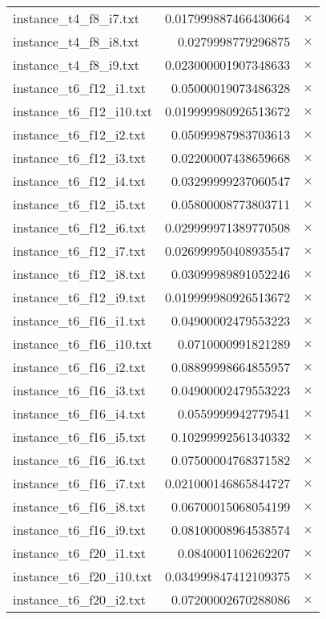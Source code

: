 \documentclass{article}
\begin{document}
\begin{center}
\begin{tabular}{|l|rr|}
instance\_t4\_f8\_i7.txt & 0.017999887466430664 & $\times$ \\
instance\_t4\_f8\_i8.txt & 0.0279998779296875 & $\times$ \\
instance\_t4\_f8\_i9.txt & 0.023000001907348633 & $\times$ \\
instance\_t6\_f12\_i1.txt & 0.05000019073486328 & $\times$ \\
instance\_t6\_f12\_i10.txt & 0.019999980926513672 & $\times$ \\
instance\_t6\_f12\_i2.txt & 0.05099987983703613 & $\times$ \\
instance\_t6\_f12\_i3.txt & 0.02200007438659668 & $\times$ \\
instance\_t6\_f12\_i4.txt & 0.03299999237060547 & $\times$ \\
instance\_t6\_f12\_i5.txt & 0.05800008773803711 & $\times$ \\
instance\_t6\_f12\_i6.txt & 0.029999971389770508 & $\times$ \\
instance\_t6\_f12\_i7.txt & 0.026999950408935547 & $\times$ \\
instance\_t6\_f12\_i8.txt & 0.03099989891052246 & $\times$ \\
instance\_t6\_f12\_i9.txt & 0.019999980926513672 & $\times$ \\
instance\_t6\_f16\_i1.txt & 0.04900002479553223 & $\times$ \\
instance\_t6\_f16\_i10.txt & 0.0710000991821289 & $\times$ \\
instance\_t6\_f16\_i2.txt & 0.08899998664855957 & $\times$ \\
instance\_t6\_f16\_i3.txt & 0.04900002479553223 & $\times$ \\
instance\_t6\_f16\_i4.txt & 0.0559999942779541 & $\times$ \\
instance\_t6\_f16\_i5.txt & 0.10299992561340332 & $\times$ \\
instance\_t6\_f16\_i6.txt & 0.07500004768371582 & $\times$ \\
instance\_t6\_f16\_i7.txt & 0.021000146865844727 & $\times$ \\
instance\_t6\_f16\_i8.txt & 0.06700015068054199 & $\times$ \\
instance\_t6\_f16\_i9.txt & 0.08100008964538574 & $\times$ \\
instance\_t6\_f20\_i1.txt & 0.0840001106262207 & $\times$ \\
instance\_t6\_f20\_i10.txt & 0.034999847412109375 & $\times$ \\
instance\_t6\_f20\_i2.txt & 0.07200002670288086 & $\times$ \\

\end{tabular}
\end{center}
\end{document}
